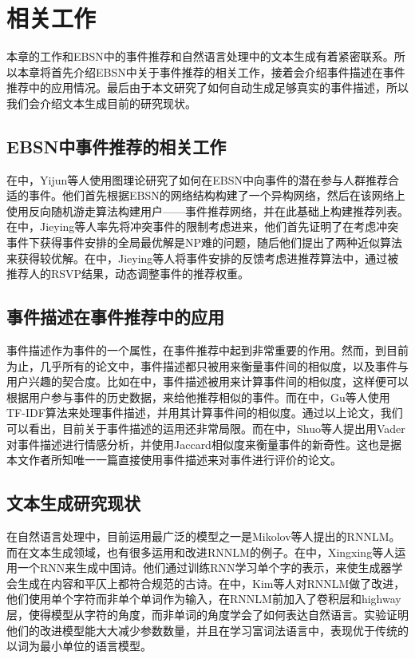 % 
\section{相关工作}
本章的工作和EBSN中的事件推荐和自然语言处理中的文本生成有着紧密联系。所以本章将首先介绍EBSN中关于事件推荐的相关工作，接着会介绍事件描述在事件推荐中的应用情况。最后由于本文研究了如何自动生成足够真实的事件描述，所以我们会介绍文本生成目前的研究现状。
\subsection{EBSN中事件推荐的相关工作}
在\cite{EBSN_event_reco}中，Yijun等人使用图理论研究了如何在EBSN中向事件的潜在参与人群推荐合适的事件。他们首先根据EBSN的网络结构构建了一个异构网络，然后在该网络上使用反向随机游走算法构建用户——事件推荐网络，并在此基础上构建推荐列表。在\cite{EBSN_conflict-aware_2016}中，Jieying等人率先将冲突事件的限制考虑进来，他们首先证明了在考虑冲突事件下获得事件安排的全局最优解是NP难的问题，随后他们提出了两种近似算法来获得较优解。在\cite{EBSN_feedback-aware_2017}中，Jieying等人将事件安排的反馈考虑进推荐算法中，通过被推荐人的RSVP结果，动态调整事件的推荐权重。

\subsection{事件描述在事件推荐中的应用}
事件描述作为事件的一个属性，在事件推荐中起到非常重要的作用。然而，到目前为止，几乎所有的论文中，事件描述都只被用来衡量事件间的相似度，以及事件与用户兴趣的契合度。比如在\cite{EBSN_who_will}中，事件描述被用来计算事件间的相似度，这样便可以根据用户参与事件的历史数据，来给他推荐相似的事件。而在\cite{gu_context_2016}中，Gu等人使用TF-IDF算法来处理事件描述，并用其计算事件间的相似度。通过以上论文，我们可以看出，目前关于事件描述的运用还非常局限。而在\cite{event_organization_101}中，Shuo等人提出用Vader对事件描述进行情感分析，并使用Jaccard相似度来衡量事件的新奇性。这也是据本文作者所知唯一一篇直接使用事件描述来对事件进行评价的论文。

\subsection{文本生成研究现状}
在自然语言处理中，目前运用最广泛的模型之一是Mikolov等人提出的RNNLM\cite{mikolov_rnnlm_2011}。而在文本生成领域，也有很多运用和改进RNNLM的例子。在\cite{Chinese_Poetry}中，Xingxing等人运用一个RNN来生成中国诗。他们通过训练RNN学习单个字的表示，来使生成器学会生成在内容和平仄上都符合规范的古诗。在\cite{kim_character-aware_2015}中，Kim等人对RNNLM做了改进，他们使用单个字符而非单个单词作为输入，在RNNLM前加入了卷积层和highway层，使得模型从字符的角度，而非单词的角度学会了如何表达自然语言。实验证明他们的改进模型能大大减少参数数量，并且在学习富词法语言中，表现优于传统的以词为最小单位的语言模型。

